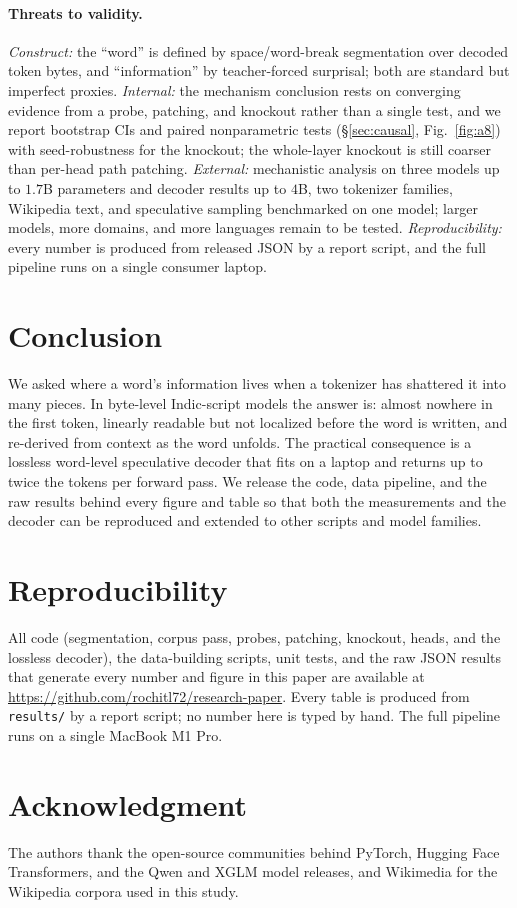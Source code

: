 \paragraph{Threats to validity.} \emph{Construct:} the ``word'' is defined by
space/word-break segmentation over decoded token bytes, and ``information'' by
teacher-forced surprisal; both are standard but imperfect proxies. \emph{Internal:}
the mechanism conclusion rests on converging evidence from a probe, patching,
and knockout rather than a single test, and we report bootstrap CIs and paired
nonparametric tests (\S\ref{sec:causal}, Fig.~\ref{fig:a8}) with seed-robustness
for the knockout; the whole-layer knockout is still coarser than per-head path
patching. \emph{External:} mechanistic analysis on three models up to $1.7$B
parameters and decoder results up to $4$B, two tokenizer families, Wikipedia
text, and speculative sampling benchmarked on one model; larger models, more
domains, and more languages remain to be tested. \emph{Reproducibility:} every
number is produced from released JSON by a report script, and the full pipeline
runs on a single consumer laptop.

\section{Conclusion}

We asked where a word's information lives when a tokenizer has shattered it into
many pieces. In byte-level Indic-script models the answer is: almost nowhere in
the first token, linearly readable but not localized before the word is written,
and re-derived from context as the word unfolds. The practical consequence is a
lossless word-level speculative decoder that fits on a laptop and returns up to
twice the tokens per forward pass. We release the code, data pipeline, and the
raw results behind every figure and table so that both the measurements and the
decoder can be reproduced and extended to other scripts and model families.

\section*{Reproducibility}

All code (segmentation, corpus pass, probes, patching, knockout, heads, and the
lossless decoder), the data-building scripts, unit tests, and the raw JSON
results that generate every number and figure in this paper are available at
\url{https://github.com/rochitl72/research-paper}. Every table is produced from
\texttt{results/} by a report script; no number here is typed by hand. The full
pipeline runs on a single MacBook M1 Pro.

\section*{Acknowledgment}
The authors thank the open-source communities behind PyTorch, Hugging Face
Transformers, and the Qwen and XGLM model releases, and Wikimedia for the
Wikipedia corpora used in this study.
